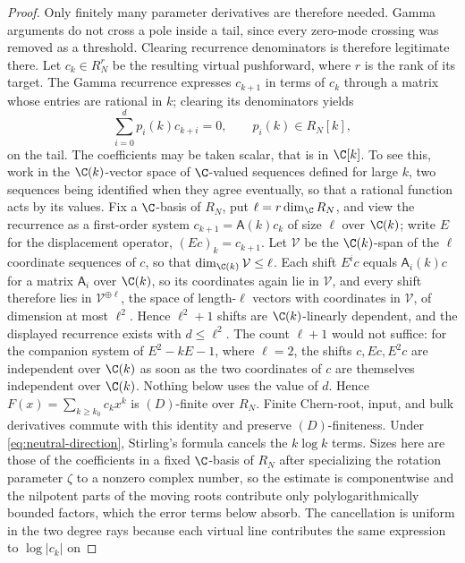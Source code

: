 \begin{proof}
Only finitely many parameter derivatives are therefore needed.  Gamma
arguments do not cross a pole inside a tail, since every zero-mode crossing
was removed as a threshold.  Clearing recurrence denominators is therefore
legitimate there.  Let \(c_k\in R_N^r\) be the resulting virtual pushforward,
where \(r\) is the rank of its target.  The
Gamma recurrence expresses \(c_{k+1}\) in terms of \(c_k\) through a matrix
whose entries are rational in \(k\); clearing
its denominators yields
\[
 \sum_{i=0}^d p_i(k)c_{k+i}=0,
 \qquad p_i(k)\in R_N[k],
\]
on the tail.  The coefficients may be taken scalar, that is in \(\C[k]\).  To
see this, work in the \(\C(k)\)-vector space of \(\C\)-valued sequences
defined for large \(k\), two sequences being identified when they agree
eventually, so that a rational function acts by its values.  Fix a
\(\C\)-basis of \(R_N\), put \(\ell=r\dim_{\C}R_N\), and view the
recurrence as a first-order system \(c_{k+1}=\mathsf A(k)c_k\) of size
\(\ell\) over \(\C(k)\); write \(E\) for the displacement operator,
\((Ec)_k=c_{k+1}\).  Let
\(\mathcal V\) be the \(\C(k)\)-span of the \(\ell\) coordinate sequences of
\(c\), so that \(\dim_{\C(k)}\mathcal V\leq\ell\).  Each shift \(E^ic\)
equals \(\mathsf A_i(k)c\) for a matrix \(\mathsf A_i\) over \(\C(k)\), so its
coordinates again
lie in \(\mathcal V\), and every shift therefore lies in
\(\mathcal V^{\oplus\ell}\), the space of length-\(\ell\) vectors with
coordinates in \(\mathcal V\), of
dimension at most \(\ell^2\).  Hence \(\ell^2+1\) shifts are
\(\C(k)\)-linearly dependent, and
the displayed recurrence exists with \(d\leq\ell^2\).  The count
\(\ell+1\) would not suffice: for the companion system of
\(E^2-kE-1\), where \(\ell=2\), the shifts \(c,Ec,E^2c\)
are independent over \(\C(k)\) as soon as the two coordinates of \(c\) are
themselves independent over \(\C(k)\).
Nothing below uses the value of \(d\).  Hence \(F(x)=\sum_{k\geq k_0}c_kx^k\) is \((D)\)-finite over
\(R_N\).  Finite Chern-root, input, and bulk derivatives commute with this
identity and preserve \((D)\)-finiteness.  Under
\eqref{eq:neutral-direction}, Stirling's
formula cancels the
\(k\log k\) terms.  Sizes here are those of the coefficients in a fixed
\(\C\)-basis of \(R_N\) after specializing the rotation parameter \(\zeta\) to
a nonzero complex number, so the estimate is componentwise and the nilpotent
parts of the moving roots contribute only polylogarithmically bounded factors,
which the error terms below absorb.  The cancellation
is uniform in
the two degree rays
because each virtual line contributes the same expression to \(\log|c_k|\) on

\end{proof}

